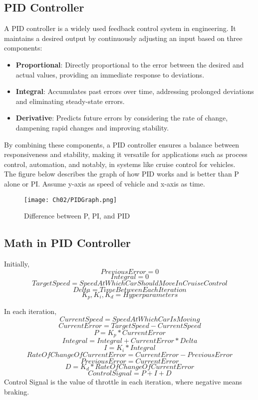 \subsection{PID Controller}
A PID controller is a widely used feedback control system in engineering. It maintains a desired output by continuously adjusting an input based on three components:
\begin{itemize}
    \item \textbf{Proportional}: Directly proportional to the error between the desired and actual values, providing an immediate response to deviations.
    \item \textbf{Integral}: Accumulates past errors over time, addressing prolonged deviations and eliminating steady-state errors.
    \item \textbf{Derivative}: Predicts future errors by considering the rate of change, dampening rapid changes and improving stability.
\end{itemize}
By combining these components, a PID controller ensures a balance between responsiveness and stability, making it versatile for applications such as process control, automation, and notably, in systems like cruise control for vehicles.
\\
The figure below describes the graph of how PID works and is better than P alone or PI. Assume y-axis as speed of vehicle and x-axis as time.
\begin{figure}[h]
    \centering
    \texttt{[image: Ch02/PIDGraph.png]}
    \caption{Difference between P, PI, and PID}
    \label{figure:1}
\end{figure}
\FloatBarrier

\subsection{Math in PID Controller}
Initially,
\[ PreviousError = 0 \]
\[ Integral = 0 \]
\[ TargetSpeed = SpeedAtWhichCarShouldMoveInCruiseControl \]
\[ Delta = TimeBetweenEachIteration \]
\[ K_p, K_i, K_d = Hyperparameters \]

In each iteration,
\[ CurrentSpeed = SpeedAtWhichCarIsMoving \]
\[ CurrentError = TargetSpeed - CurrentSpeed \]
\[ P = K_p * CurrentError \]
\[ Integral = Integral + CurrentError * Delta \]
\[ I = K_i * Integral \]
\[ RateOfChangeOfCurrentError = CurrentError - PreviousError \]
\[ PreviousError = CurrentError \]
\[ D = K_d * RateOfChangeOfCurrentError \]
\[ ControlSignal = P + I + D \]
Control Signal is the value of throttle in each iteration, where negative means braking.

